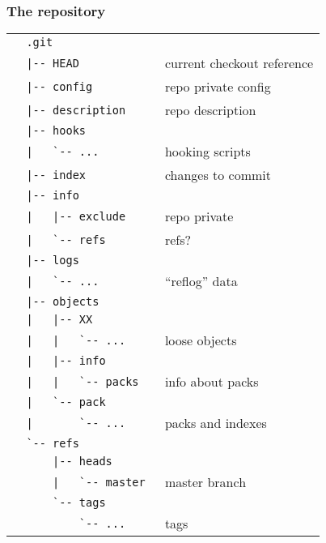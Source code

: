 \documentclass[english]{beamer}
\begin{document}
\begin{frame}[fragile]
\frametitle{The repository}
{\tiny
\begin{tabular}{ll}
        \verb!  .git               !  & \\
        \verb!  |-- HEAD           !  & current checkout reference \\
        \verb!  |-- config         !  & repo private config \\
        \verb!  |-- description    !  & repo description \\
        \verb!  |-- hooks          !  & \\
        \verb!  |   `-- ...        !  & hooking scripts \\
        \verb!  |-- index          !  & changes to commit \\
        \verb!  |-- info           !  & \\
        \verb!  |   |-- exclude    !  & repo private \\
        \verb!  |   `-- refs       !  & refs? \\
        \verb!  |-- logs           !  & \\
        \verb!  |   `-- ...        !  & ``reflog'' data \\
        \verb!  |-- objects        !  & \\
        \verb!  |   |-- XX         !  & \\
        \verb!  |   |   `-- ...    !  & loose objects \\
        \verb!  |   |-- info       !  & \\
        \verb!  |   |   `-- packs  !  & info about packs \\
        \verb!  |   `-- pack       !  & \\
        \verb!  |       `-- ...    !  & packs and indexes \\
        \verb!  `-- refs           !  & \\
        \verb!      |-- heads      !  & \\
        \verb!      |   `-- master !  & master branch \\
        \verb!      `-- tags       !  & \\
        \verb!          `-- ...    !  & tags \\
\end{tabular}
}
\end{frame}
\end{document}
